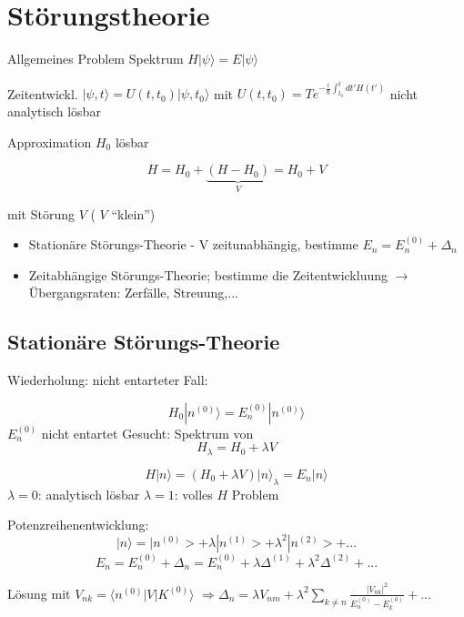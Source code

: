 




\tableofcontents
\setcounter{chapter}{2}
\chapter{Störungstheorie}


Allgemeines Problem Spektrum \(H|\psi\rangle=E|\psi\rangle\)

Zeitentwickl. \(|\psi,t\rangle = U(t,t_0)|\psi,t_0\rangle\) mit \(U(t,t_0)=T e^{-\frac i \hbar \int^t_{t_0}dt'H(t')}\) nicht analytisch lösbar

Approximation \(H_0\) lösbar

\[H = H_0 + \underbrace{(H-H_0)}_{V} = H_0 + V \]

mit Störung \(V\) ( \(V\) ``klein'')

\begin{itemize}
\item Stationäre Störungs-Theorie - V zeitunabhängig, bestimme \(E_n=E^{(0)}_n+\Delta_n\)
\item Zeitabhängige Störungs-Theorie; bestimme die Zeitentwickluung \(\rightarrow\) Übergangsraten: Zerfälle, Streuung,...
\end{itemize}

\section{Stationäre Störungs-Theorie}
Wiederholung: nicht entarteter Fall:

\[ H_0|n^{(0)}\rangle = E^{(0)}_n|n^{(0)}\rangle \]
\(E^{(0)}_n\) nicht entartet Gesucht: Spektrum von
\[ H_\lambda = H_0+\lambda V\]

\[ H|n\rangle = (H_0 + \lambda V)|n\rangle_\lambda = E_n|n\rangle \]
\(\lambda = 0\): analytisch lösbar \(\lambda = 1\): volles \(H\) Problem

Potenzreihenentwicklung:
\[ |n\rangle = |n^{(0)}>+\lambda|n^{(1)}>+\lambda^2|n^{(2)}>+...\]
\[ E_n= E^{(0)}_n + \Delta_n = E^{(0)}_n +
\lambda\Delta^{(1)}+\lambda^2\Delta^{(2)}+...\]

Lösung mit \(V_{nk}=\langle n^{(0)}|V|K^{(0)}\rangle\) \(\Rightarrow \Delta_n = \lambda V_{nm} + \lambda^2\sum_{k\neq n}\frac{|V_{nk}|^2}{E^{(0)}_n-E^{(0)}_k}+...\)

